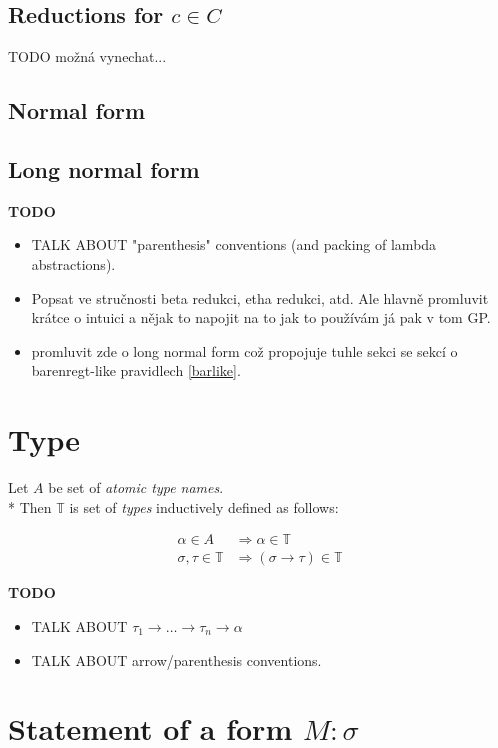 \documentclass[12pt,a4paper]{report}
\begin{document}
\subsection{Reductions for $c \in C$}
TODO možná vynechat...

\subsection{Normal form}

\subsection{Long normal form}


\textbf{TODO} 
\begin{itemize} 
	\item TALK ABOUT "parenthesis" conventions 
	      (and packing of lambda abstractions).
	\item Popsat ve stručnosti beta redukci,
	      etha redukci, atd.
	      Ale hlavně promluvit krátce o intuici
	      a nějak to napojit na to jak to používám já
	      pak v tom GP.
	\item promluvit zde o long normal form což propojuje 
		  tuhle sekci se sekcí o barenregt-like 	
		  pravidlech \ref{barlike}.
\end{itemize}

\section{Type}
\label{deftype}

	Let $A$ be set of {\it atomic type names}. \\*
	Then $\mathbb{T}$ is set of {\it types} inductively defined as follows:
	
	\begin{align*}
	\alpha      \in A          &\Rightarrow     \alpha   \in \mathbb{T} \\
	\sigma,\tau \in \mathbb{T} &\Rightarrow ( \sigma \rightarrow  \tau ) \in \mathbb{T} 
	\end{align*} 

\textbf{TODO} 
\begin{itemize}
	\item TALK ABOUT $\tau_1 \rightarrow \dots \rightarrow \tau_n \rightarrow \alpha$ 
	\item TALK ABOUT arrow/parenthesis conventions. 
\end{itemize}
	
	
\section{Statement of a form $M : \sigma$}
\end{document}
